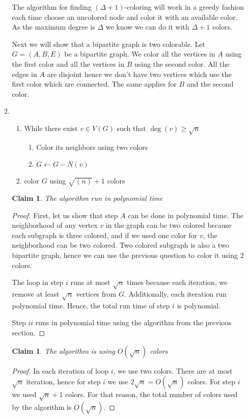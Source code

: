 \documentclass{article}
\newtheorem{claim}[section]{Claim}
\begin{document}
\begin{enumerate}
\begin{enumerate}
The algorithm for finding $(\Delta+1)$-coloring will work in a greedy fashion each time choose an uncolored node and color it with an available color. As the maximum degree is $\Delta$ we know we can do it with $\Delta +1$ colors.

Next we will show that a bipartite graph is two colorable. Let $G = (A, B, E)$ be a bipartite graph. We color all the vertices in $A$ using the first color and all the vertices in $B$ using the second color. All the edges in $A$ are disjoint hence we don't have two vertices which use the first color which are connected. The same applies for $B$ and the second color.
	\item
	\begin{enumerate}
		\item While there exist $v \in V(G)$ such that $\deg(v) \geq \sqrt{n}$
		\begin{enumerate}
			\item Color its neighbors using two colors
			\item $G \leftarrow G - N(v)$
		\end{enumerate}
		\item color $G$ using $\sqrt{(n)} + 1$ colors
	\end{enumerate}
	

	\begin{claim}
		The algorithm run in polynomial time
\end{claim}
\begin{proof}
	First, let us show that step $A$ can be done in polynomial time. The neighborhood of any vertex $v$ in the graph can be two colored because each subgraph is three colored, and if we used one color for $v$, the neighborhood can be two colored. Two colored subgraph is also a two bipartite graph, hence we can use the previous question to color it using 2 colors.
	
	The loop in step $i$ runs at most $\sqrt{n}$ times because each iteration, we remove at least $\sqrt{n}$ vertices from $G$. Additionally, each iteration run polynomial time. Hence, the total run time of step $i$ is polynomial.
	
	Step $ii$ runs in polynomial time using the algorithm from the previous section.
\end{proof}

\begin{claim}
	The algorithm is using $O(\sqrt n)$ colors
\end{claim}
\begin{proof}
	In each iteration of loop $i$, we use two colors. There are at most $\sqrt{n}$ iteration, hence for step $i$ we use $2 \sqrt n = O(\sqrt n)$ colors.
	For step $i$ we used $\sqrt n + 1$ colors.
	For that reason, the total number of colors used by the algorithm is $O(\sqrt n)$.
\end{proof}
\end{enumerate}
\end{enumerate}
\end{document}
